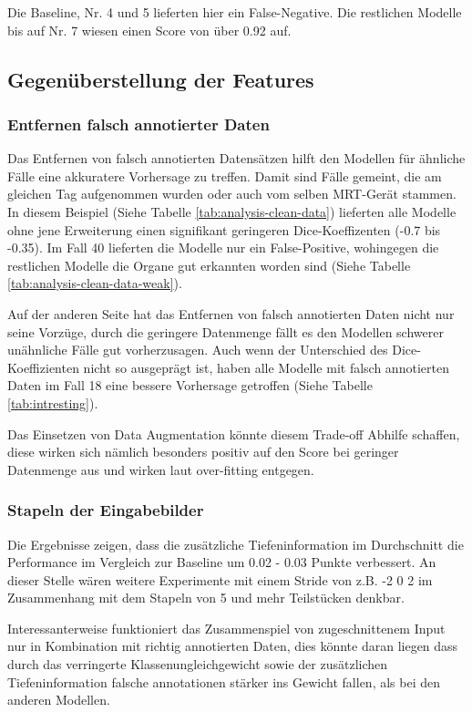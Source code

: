 Die Baseline, Nr. 4 und 5 lieferten hier ein False-Negative. Die restlichen Modelle bis auf Nr. 7 wiesen einen Score von über 0.92 auf. 

\subsection{Gegenüberstellung der Features}

\subsubsection{Entfernen falsch annotierter Daten}

Das Entfernen von falsch annotierten Datensätzen hilft den Modellen für ähnliche Fälle eine akkuratere Vorhersage zu treffen. Damit sind Fälle gemeint, die am gleichen Tag aufgenommen wurden oder auch vom selben MRT-Gerät stammen. In diesem Beispiel (Siehe Tabelle \ref{tab:analysis-clean-data}) lieferten alle Modelle ohne jene Erweiterung einen signifikant geringeren Dice-Koeffizenten (-0.7 bis -0.35). Im Fall 40 lieferten die Modelle nur ein False-Positive, wohingegen die restlichen Modelle die Organe gut erkannten worden sind (Siehe Tabelle \ref{tab:analysis-clean-data-weak}).

Auf der anderen Seite hat das Entfernen von falsch annotierten Daten nicht nur seine Vorzüge, durch die geringere Datenmenge fällt es den Modellen schwerer unähnliche Fälle gut vorherzusagen. Auch wenn der Unterschied des Dice-Koeffizienten nicht so ausgeprägt ist, haben alle Modelle mit falsch annotierten Daten im Fall 18 eine bessere Vorhersage getroffen (Siehe Tabelle \ref{tab:intresting}).

Das Einsetzen von Data Augmentation könnte diesem Trade-off Abhilfe schaffen, diese wirken sich nämlich besonders positiv auf den Score bei geringer Datenmenge aus und wirken laut \citet{U-Net} over-fitting entgegen. 

\subsubsection{Stapeln der Eingabebilder}

Die Ergebnisse zeigen, dass die zusätzliche Tiefeninformation im Durchschnitt die Performance im Vergleich zur Baseline um 0.02 - 0.03 Punkte verbessert. An dieser Stelle wären weitere Experimente mit einem Stride von z.B. -2 0 2 im Zusammenhang mit dem Stapeln von 5 und mehr Teilstücken denkbar. 

Interessanterweise funktioniert das Zusammenspiel von zugeschnittenem Input nur in Kombination mit richtig annotierten Daten, dies könnte daran liegen dass durch das verringerte Klassenungleichgewicht sowie der zusätzlichen Tiefeninformation falsche annotationen stärker ins Gewicht fallen, als bei den anderen Modellen.

